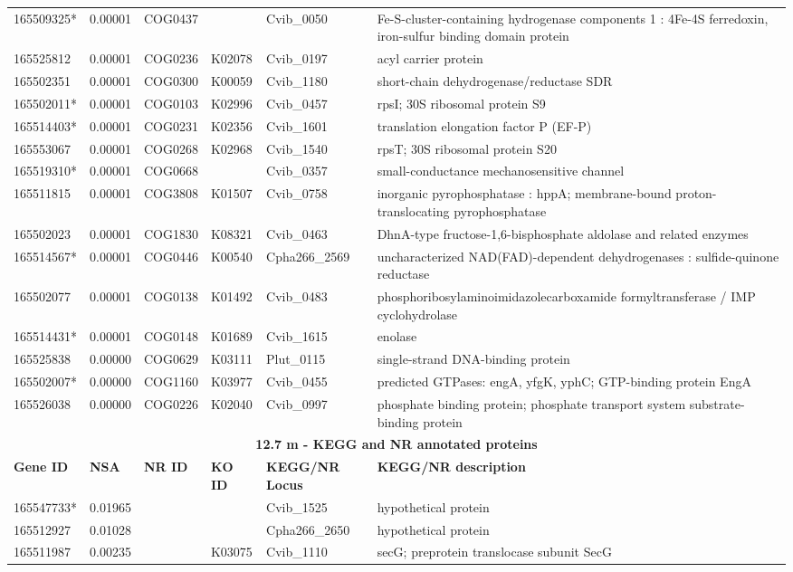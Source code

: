 \begin{landscape}
\begin{longtable}{p{1.6cm}p{1.2cm}p{1.5cm}p{1.5cm}p{2.8cm}p{13.5cm}}
165509325*&0.00001&COG0437&&Cvib\_0050&Fe-S-cluster-containing hydrogenase components 1 : 4Fe-4S ferredoxin, iron-sulfur binding domain protein \\
165525812&0.00001&COG0236&K02078&Cvib\_0197&acyl carrier protein \\
165502351&0.00001&COG0300&K00059&Cvib\_1180&short-chain dehydrogenase/reductase SDR \\
165502011*&0.00001&COG0103&K02996&Cvib\_0457&rpsI; 30S ribosomal protein S9 \\
165514403*&0.00001&COG0231&K02356&Cvib\_1601&translation elongation factor P (EF-P) \\
165553067&0.00001&COG0268&K02968&Cvib\_1540&rpsT; 30S ribosomal protein S20 \\
165519310*&0.00001&COG0668&&Cvib\_0357&small-conductance mechanosensitive channel \\
165511815&0.00001&COG3808&K01507&Cvib\_0758&inorganic pyrophosphatase : hppA; membrane-bound proton-translocating pyrophosphatase \\
165502023&0.00001&COG1830&K08321&Cvib\_0463&DhnA-type fructose-1,6-bisphosphate aldolase and related enzymes \\
165514567*&0.00001&COG0446&K00540&Cpha266\_2569&uncharacterized NAD(FAD)-dependent dehydrogenases : sulfide-quinone reductase \\
165502077&0.00001&COG0138&K01492&Cvib\_0483&phosphoribosylaminoimidazolecarboxamide formyltransferase / IMP cyclohydrolase \\
165514431*&0.00001&COG0148&K01689&Cvib\_1615&enolase \\
165525838&0.00000&COG0629&K03111&Plut\_0115&single-strand DNA-binding protein \\
165502007*&0.00000&COG1160&K03977&Cvib\_0455&predicted GTPases: engA, yfgK, yphC; GTP-binding protein EngA \\
165526038&0.00000&COG0226&K02040&Cvib\_0997&phosphate binding protein; phosphate transport system substrate-binding protein \\
\multicolumn{6}{c}{\textbf{12.7 m - KEGG and NR annotated proteins}} \\
\textbf{Gene ID} & \textbf{NSA} & \textbf{NR ID} & \textbf{KO ID} & \textbf{KEGG/NR Locus} & \textbf{KEGG/NR description} \\
165547733*&0.01965&&&Cvib\_1525&hypothetical protein \\
165512927&0.01028&&&Cpha266\_2650&hypothetical protein \\
165511987&0.00235&&K03075&Cvib\_1110&secG; preprotein translocase subunit SecG \\

\end{longtable}
\end{landscape}
